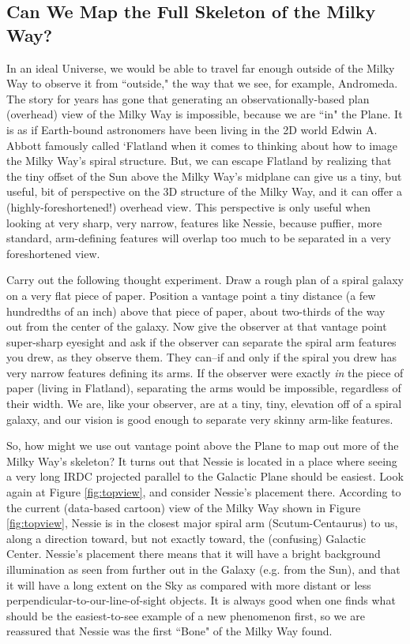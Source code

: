 \subsection{Can We Map the Full Skeleton of the Milky Way?}
\label{future}

In an ideal Universe, we would be able to travel far enough outside of the Milky Way to observe it from ``outside," the way that we see, for example, Andromeda.  The story for years has gone that generating an observationally-based plan (overhead) view of the Milky Way is impossible, because we are ``in" the Plane.  It is as if Earth-bound astronomers have been living in the 2D world Edwin A. Abbott famously called `Flatland \citep{Abbott2008} when it comes to thinking about how to image the Milky Way's spiral structure. But, we can escape Flatland by realizing that the tiny offset of the Sun above the Milky Way's midplane can give us a tiny, but useful, bit of perspective on the 3D structure of the Milky Way, and it can  offer a (highly-foreshortened!) overhead view.  This perspective is only useful when looking at very sharp, very narrow, features like Nessie, because puffier, more standard, arm-defining features will overlap too much to be separated in a very foreshortened view. 

Carry out the following thought experiment.  Draw a rough plan of a spiral galaxy on a very flat piece of paper.  Position a vantage point a tiny distance (a few hundredths of an inch) above that piece of paper, about two-thirds of the way out from the center of the galaxy.  Now give the observer at that vantage point super-sharp eyesight and ask if the observer can separate the  spiral arm features you drew, as they observe them.  They can--if and only if the spiral you drew has very narrow features defining its arms.  If the observer were exactly {\it in} the piece of paper (living in Flatland), separating the arms would be impossible, regardless of their width.  We are, like your observer, are at a tiny, tiny, elevation off of a spiral galaxy, and our vision is good enough to separate very skinny arm-like features.

So, how might we use out vantage point above the Plane to map out more of the Milky Way's skeleton?  It turns out that Nessie is located in a place where seeing a very long IRDC projected parallel to the Galactic Plane should be  easiest.  Look again at Figure \ref{fig:topview}, and consider Nessie's placement there.  According to the current (data-based cartoon) view of the Milky Way shown in Figure \ref{fig:topview}, Nessie is in the closest major spiral arm (Scutum-Centaurus) to us, along a direction toward, but not exactly toward, the (confusing) Galactic Center.  Nessie's placement there means that it will have a bright background illumination as seen from further out in the Galaxy (e.g. from the Sun), and that it will have a long extent on the Sky as compared with more distant or less perpendicular-to-our-line-of-sight objects.  It is always good when one finds what should be the easiest-to-see example of a new phenomenon first, so we are reassured that Nessie was the first ``Bone" of the Milky Way found.


